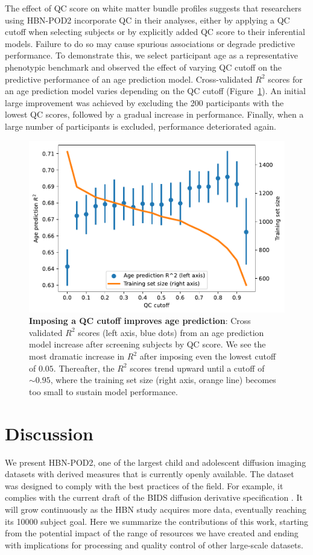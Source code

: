\documentclass[fleqn,10pt]{wlscirep}
\begin{document}
The effect of QC score on white matter bundle profiles suggests that researchers
using HBN-POD2 incorporate QC in their analyses, either by applying a QC cutoff
when selecting subjects or by explicitly added QC score to their inferential
models. Failure to do so may cause spurious associations or degrade predictive
performance. To demonstrate this, we select participant age as a representative
phenotypic benchmark \cite{cole2019brain,richie-halford2021multidimensional} and
observed the effect of varying QC cutoff on the predictive performance of an age
prediction model. Cross-validated $R^2$ scores for an age prediction model
varies depending on the QC cutoff (Figure~\ref{fig:age-prediction}). An initial large improvement was achieved by excluding the 200 participants with the lowest QC scores, followed by a gradual increase in performance. Finally, when a large number of participants is excluded, performance deteriorated again.

\begin{figure}[htbp]
    \centering
    \includegraphics[width=0.5\linewidth]{age-prediction/qc_sweep.pdf}
    \caption{%
        {\bf Imposing a QC cutoff improves age prediction}:
        Cross validated $R^2$ scores (left axis, blue dots) from an age
        prediction model increase after screening subjects by QC score. We see
        the most dramatic increase in $R^2$ after imposing even the lowest
        cutoff of $0.05$. Thereafter, the $R^2$ scores trend upward until a
        cutoff of $\sim 0.95$, where the training set size (right axis, orange
        line) becomes too small to sustain model performance.
    }
    \label{fig:age-prediction}
\end{figure}

\section*{Discussion}

We present HBN-POD2, one of the largest child and adolescent diffusion imaging
datasets with derived measures that is currently openly available. The dataset
was designed to comply with the best practices of the field. For example, it
complies with the current draft of the BIDS diffusion derivative specification
\cite{Pestilli2021}. It will grow continuously as the HBN study acquires more
data, eventually reaching its \num{10000} subject goal. Here we summarize the
contributions of this work, starting from the potential impact of the range of
resources we have created and ending with implications for processing and
quality control of other large-scale datasets.
\end{document}
